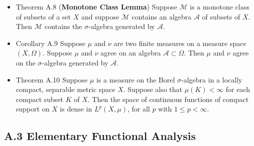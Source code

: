 \begin{itemize}
\item Theorem A.8 (\textbf{Monotone Class Lemma}) Suppose $\mathcal{M}$ is a monotone class of subsets of a set $X$ and suppose $\mathcal{M}$ contains an algebra $\mathcal{A}$ of subsets of $X$. Then $\mathcal{M}$ contains the $\sigma$-algebra generated by $\mathcal{A}$.

\item Corollary A.9 Suppose $\mu$ and $\nu$ are two finite measures on a measure space $(X, \Omega)$. Suppose $\mu$ and $\nu$ agree on an algebra $\mathcal{A} \subset \Omega$. Then $\mu$ and $\nu$ agree on the $\sigma$-algebra generated by $\mathcal{A}$.

\item Theorem A.10 Suppose $\mu$ is a measure on the Borel $\sigma$-algebra in a locally compact, separable metric space $X$. Suppose also that $\mu(K)<\infty$ for each compact subset $K$ of $X$. Then the space of continuous functions of compact support on $X$ is dense in $L^{p}(X, \mu)$, for all $p$ with $1 \leq p<\infty$.
\end{itemize}

\subsection{A.3 Elementary Functional Analysis}

